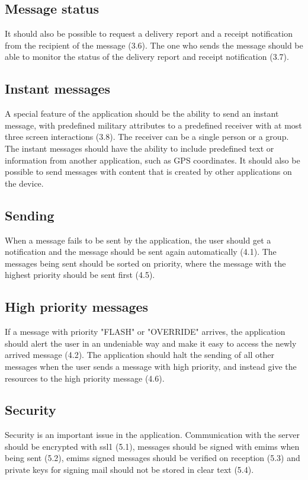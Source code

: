 \subsection{Message status}
It should also be possible to request a delivery report and a receipt notification from the recipient of the message (3.6). The one who sends the message should be able to monitor the status of the delivery report and receipt notification (3.7).

\subsection{Instant messages}
A special feature of the application should be the ability to send an instant message, with predefined military attributes to a predefined receiver with at most three screen interactions (3.8). The receiver can be a single person or a group. The instant messages should have the ability to include predefined text or information from another application, such as GPS coordinates. It should also be possible to send messages with content that is created by other applications on the device.

\subsection{Sending}
When a message fails to be sent by the application, the user should get a notification and the message should be sent again automatically (4.1). The messages being sent should be sorted on priority, where the message with the highest priority should be sent first (4.5).

\subsection{High priority messages}
If a message with priority "FLASH" or "OVERRIDE" arrives, the application should alert the user in an undeniable way and make it easy to access the newly arrived message (4.2). The application should halt the sending of all other messages when the user sends a message with high priority, and instead give the resources to the high priority message (4.6).

\subsection{Security}
Security is an important issue in the application. Communication with the server should be encrypted with \gls{ssl1} (5.1), messages should be signed with \gls{emims} when being sent (5.2), \gls{emims} signed messages should be verified on reception (5.3) and private keys for signing mail should not be stored in clear text (5.4).
